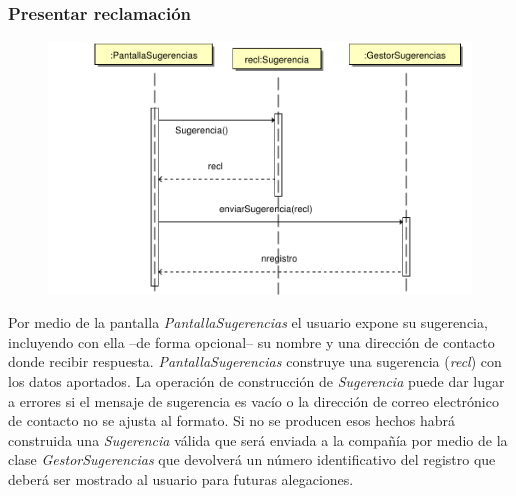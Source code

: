 \documentclass[11pt, a4paper, twoside, titlepage]{article}
\begin{document}
			\subsubsection{Presentar reclamación}
				\begin{figure}[H]\centering
					\includegraphics[scale=.7]{diagramas/presentarreclamacion.pdf}
				\end{figure}

				Por medio de la pantalla {\itshape PantallaSugerencias} el usuario expone su sugerencia, incluyendo con ella --de forma opcional-- su nombre y una dirección de contacto donde recibir respuesta. {\itshape PantallaSugerencias} construye una sugerencia ({\itshape recl}) con los datos aportados. La operación de construcción de {\itshape Sugerencia} puede dar lugar a errores si el mensaje de sugerencia es vacío o la dirección de correo electrónico de contacto no se ajusta al formato. Si no se producen esos hechos habrá construida una {\itshape Sugerencia} válida que será enviada a la compañía por medio de la clase {\itshape GestorSugerencias} que devolverá un número identificativo del registro que deberá ser mostrado al usuario para futuras alegaciones.
\end{document}
